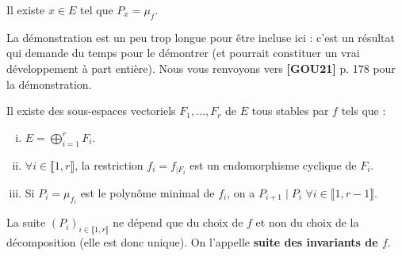 
	\begin{lemma}
		\label{invariants-de-similitude-2}
		Il existe $x \in E$ tel que $P_x = \mu_f$.
	\end{lemma}

	\begin{remark}
		La démonstration est un peu trop longue pour être incluse ici : c'est un résultat qui demande du temps pour le démontrer (et pourrait constituer un vrai développement à part entière). Nous vous renvoyons vers \textbf{[GOU21]} p. 178 pour la démonstration.
	\end{remark}
	
	\begin{theorem}[Frobenius]
		Il existe des sous-espaces vectoriels $F_1, \dots, F_r$ de $E$ tous stables par $f$ tels que :
		\begin{enumerate}[(i)]
			\item $E = \bigoplus_{i = 1}^r F_i$.
			\item $\forall i \in \llbracket 1, r \rrbracket$, la restriction $f_i = f_{|F_i}$ est un endomorphisme cyclique de $F_i$.
			\item Si $P_i = \mu_{f_i}$ est le polynôme minimal de $f_i$, on a $P_{i+1} \mid P_i$ $\forall i \in \llbracket 1, r-1 \rrbracket$.
		\end{enumerate}
		La suite $(P_i)_{i \in \llbracket 1, r \rrbracket}$ ne dépend que du choix de $f$ et non du choix de la décomposition (elle est donc unique). On l'appelle \textbf{suite des invariants de $f$}.
	\end{theorem}
	
